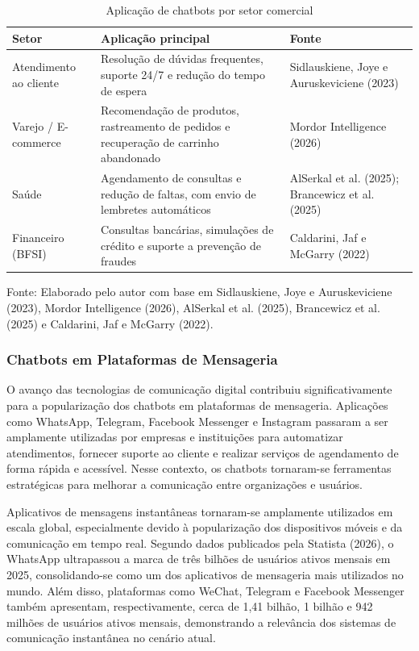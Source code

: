 \documentclass[12pt,a4paper]{extarticle}
\begin{document}
\begin{table}[H]
\centering
\caption{Aplicação de chatbots por setor comercial}
\label{tab:chatbot-setores}

\begin{tabular}{p{3.5cm}p{7cm}p{3.5cm}}
\hline
\textbf{Setor} & \textbf{Aplicação principal} & \textbf{Fonte} \\
\hline
Atendimento ao cliente &
Resolução de dúvidas frequentes, suporte 24/7 e redução do tempo de espera &
Sidlauskiene, Joye e Auruskeviciene (2023) \\
Varejo / E-commerce &
Recomendação de produtos, rastreamento de pedidos e recuperação de carrinho abandonado &
Mordor Intelligence (2026) \\
Saúde &
Agendamento de consultas e redução de faltas, com envio de lembretes automáticos &
AlSerkal et al. (2025); Brancewicz et al. (2025) \\
Financeiro (BFSI) &
Consultas bancárias, simulações de crédito e suporte a prevenção de fraudes &
Caldarini, Jaf e McGarry (2022) \\
\hline
\end{tabular}

\small Fonte: Elaborado pelo autor com base em Sidlauskiene, Joye e Auruskeviciene (2023), Mordor Intelligence (2026), AlSerkal et al. (2025), Brancewicz et al. (2025) e Caldarini, Jaf e McGarry (2022).
\end{table}

\subsubsection{Chatbots em Plataformas de Mensageria}

O avanço das tecnologias de comunicação digital contribuiu significativamente para a popularização dos chatbots em plataformas de mensageria. Aplicações como WhatsApp, Telegram, Facebook Messenger e Instagram passaram a ser amplamente utilizadas por empresas e instituições para automatizar atendimentos, fornecer suporte ao cliente e realizar serviços de agendamento de forma rápida e acessível. Nesse contexto, os chatbots tornaram-se ferramentas estratégicas para melhorar a comunicação entre organizações e usuários.

Aplicativos de mensagens instantâneas tornaram-se amplamente utilizados em escala global, especialmente devido à popularização dos dispositivos móveis e da comunicação em tempo real. Segundo dados publicados pela Statista (2026), o WhatsApp ultrapassou a marca de três bilhões de usuários ativos mensais em 2025, consolidando-se como um dos aplicativos de mensageria mais utilizados no mundo. Além disso, plataformas como WeChat, Telegram e Facebook Messenger também apresentam, respectivamente, cerca de 1,41 bilhão, 1 bilhão e 942 milhões de usuários ativos mensais, demonstrando a relevância dos sistemas de comunicação instantânea no cenário atual.
\end{document}
